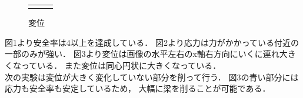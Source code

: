 \begin{figure}[H]
\begin{tabular}{ccc}
\begin{minipage}{.33\textwidth}
          \caption{変位}
          \label{img:disp1}
        \end{minipage}
      \end{tabular}
    \end{figure}

    図1より安全率は4以上を達成している．
    図2より応力は力がかかっている付近の一部のみが強い．
    図3より変位は画像の水平左右のx軸右方向にいくに連れ大きくなっている．
    また変位は同心円状に大きくなっている．\\\indent
    次の実験は変位が大きく変化していない部分を削って行う．
    図3の青い部分には応力も安全率も安定しているため，
    大幅に梁を削ることが可能である．
